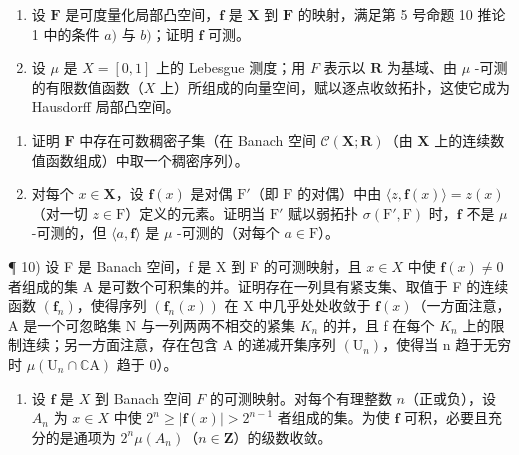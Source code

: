 \begin{enumerate}
\def\labelenumi{\arabic{enumi})}
\setcounter{enumi}{7}
\item
  设 \(\mathbf{F}\) 是可度量化局部凸空间，\(\mathbf{f}\) 是 \(\mathbf{X}\) 到 \(\mathbf{F}\) 的映射，满足第 5 号命题 10 推论 1 中的条件 \(a)\) 与 \(b)\)；证明 \(\mathbf{f}\) 可测。
\item
  设 \(\mu\) 是 \(X = [0,1]\) 上的 Lebesgue 测度；用 \(F\) 表示以 \(\mathbf{R}\) 为基域、由 \(\mu\) -可测的有限数值函数（\(X\) 上）所组成的向量空间，赋以逐点收敛拓扑，这使它成为 Hausdorff 局部凸空间。
\end{enumerate}

\begin{enumerate}
\def\labelenumi{\alph{enumi})}
\item
  证明 \(\mathbf{F}\) 中存在可数稠密子集（在 Banach 空间 \(\mathcal{C}(\mathbf{X};\mathbf{R})\)（由 \(\mathbf{X}\) 上的连续数值函数组成）中取一个稠密序列）。
\item
  对每个 \(x \in \mathbf{X}\)，设 \(\mathbf{f}(x)\) 是对偶 \(\mathrm{F}'\)（即 \(\mathrm{F}\) 的对偶）中由 \(\langle z, \mathbf{f}(x) \rangle = z(x)\)（对一切 \(z \in \mathrm{F}\)）定义的元素。证明当 \(\mathrm{F}'\) 赋以弱拓扑 \(\sigma(\mathrm{F}', \mathrm{F})\) 时，\(\mathbf{f}\) 不是 \(\mu\) -可测的，但 \(\langle a, \mathbf{f} \rangle\) 是 \(\mu\) -可测的（对每个 \(a \in \mathrm{F}\)）。
\end{enumerate}

¶ 10) 设 F 是 Banach 空间，f 是 X 到 F 的可测映射，且 \(x \in X\) 中使 \(\mathbf{f}(x) \neq 0\) 者组成的集 A 是可数个可积集的并。证明存在一列具有紧支集、取值于 F 的连续函数 \((\mathbf{f}_n)\)，使得序列 \((\mathbf{f}_n(x))\) 在 X 中几乎处处收敛于 \(\mathbf{f}(x)\)（一方面注意，A 是一个可忽略集 N 与一列两两不相交的紧集 \(K_n\) 的并，且 f 在每个 \(K_n\) 上的限制连续；另一方面注意，存在包含 A 的递减开集序列 \((\mathrm{U}_n)\)，使得当 n 趋于无穷时 \(\mu(\mathrm{U}_n \cap \mathbb{C}\mathrm{A})\) 趋于 0）。

\begin{enumerate}
\def\labelenumi{\arabic{enumi})}
\setcounter{enumi}{10}
\tightlist
\item
  设 \(\mathbf{f}\) 是 \(X\) 到 Banach 空间 \(F\) 的可测映射。对每个有理整数 \(n\)（正或负），设 \(A_{n}\) 为 \(x \in X\) 中使 \(2^{n} \geqslant |\mathbf{f}(x)| > 2^{n-1}\) 者组成的集。为使 \(\mathbf{f}\) 可积，必要且充分的是通项为 \(2^{n}\mu(A_{n})\)（\(n \in \mathbf{Z}\)）的级数收敛。
\end{enumerate}

